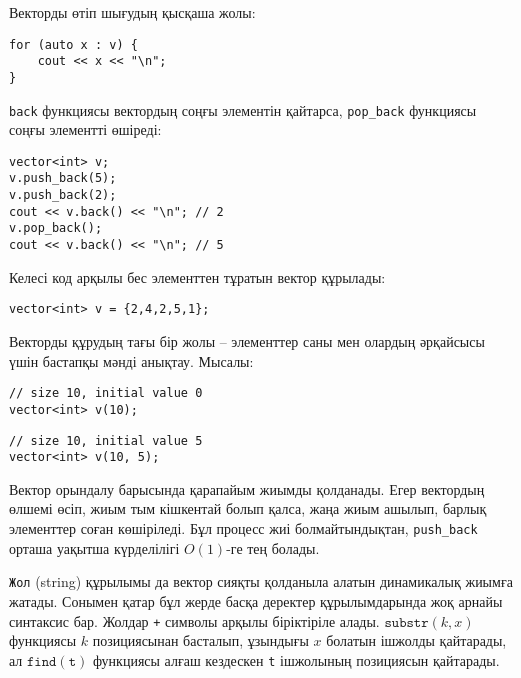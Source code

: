\begin{samepage}
Векторды өтіп шығудың қысқаша жолы:

\begin{lstlisting}
for (auto x : v) {
    cout << x << "\n";
}
\end{lstlisting}
\end{samepage}

\texttt{back} функциясы вектордың соңғы элементін қайтарса,
\texttt{pop\_back} функциясы соңғы элементті өшіреді:

\begin{lstlisting}
vector<int> v;
v.push_back(5);
v.push_back(2);
cout << v.back() << "\n"; // 2
v.pop_back();
cout << v.back() << "\n"; // 5
\end{lstlisting}

Келесі код арқылы бес элементтен тұратын вектор құрылады:

\begin{lstlisting}
vector<int> v = {2,4,2,5,1};
\end{lstlisting}

Векторды құрудың тағы бір жолы -- элементтер саны мен олардың
әрқайсысы үшін бастапқы мәнді анықтау. Мысалы:

\begin{lstlisting}
// size 10, initial value 0
vector<int> v(10);
\end{lstlisting}
\begin{lstlisting}
// size 10, initial value 5
vector<int> v(10, 5);
\end{lstlisting}

Вектор орындалу барысында қарапайым жиымды қолданады.
Егер вектордың өлшемі өсіп, жиым тым кішкентай болып қалса,
жаңа жиым ашылып, барлық элементтер соған көшіріледі.
Бұл процесс жиі болмайтындықтан, \texttt{push\_back} орташа уақытша күрделілігі
$O(1)$-ге тең болады.


\texttt{Жол} (string) құрылымы да вектор сияқты қолданыла алатын
динамикалық жиымға жатады. Сонымен қатар бұл жерде басқа деректер 
құрылымдарында жоқ арнайы синтаксис бар.
Жолдар \texttt{+} символы арқылы біріктіріле алады.
$\texttt{substr}(k,x)$ функциясы $k$ позициясынан басталып,
ұзындығы $x$ болатын ішжолды қайтарады, ал $\texttt{find}(\texttt{t})$
функциясы алғаш кездескен \texttt{t} ішжолының позициясын қайтарады.

